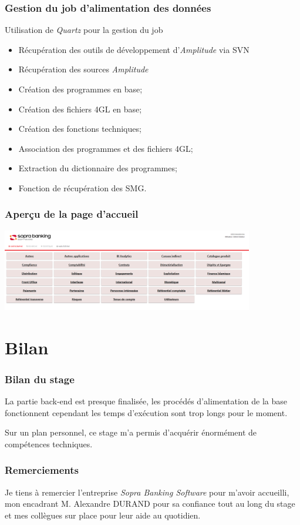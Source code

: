 \documentclass{beamer}
\begin{document}
\begin{frame}
\frametitle{Gestion du job d'alimentation des données}

Utilisation de \textit{Quartz} pour la gestion du job

\begin{itemize}
	\item Récupération des outils de développement d'\textit{Amplitude} via SVN
	\item Récupération des sources \textit{Amplitude}
	\item Création des programmes en base;
	\item Création des fichiers 4GL en base;
	\item Création des fonctions techniques;
	\item Association des programmes et des fichiers 4GL;
	\item Extraction du dictionnaire des programmes;
	\item Fonction de récupération des SMG.
\end{itemize}

\end{frame}

\begin{frame}
\frametitle{Aperçu de la page d'accueil}

\begin{center}
	\includegraphics[width=11cm]{images/cartoAccueil}
\end{center}

\end{frame}


\section*{Bilan}

\begin{frame}
\frametitle{Bilan du stage}

La partie back-end est presque finalisée, les procédés d'alimentation de la base fonctionnent cependant les temps d'exécution sont trop longs pour le moment. 

\bigbreak

Sur un plan personnel, ce stage m'a permis d'acquérir énormément de compétences techniques.

\end{frame}

\begin{frame}
\frametitle{Remerciements}

Je tiens à remercier l'entreprise \textit{Sopra Banking Software} pour m'avoir accueilli, mon encadrant M. Alexandre DURAND pour sa confiance tout au long du stage et mes collègues sur place pour leur aide au quotidien.

\end{frame}
\end{document}
